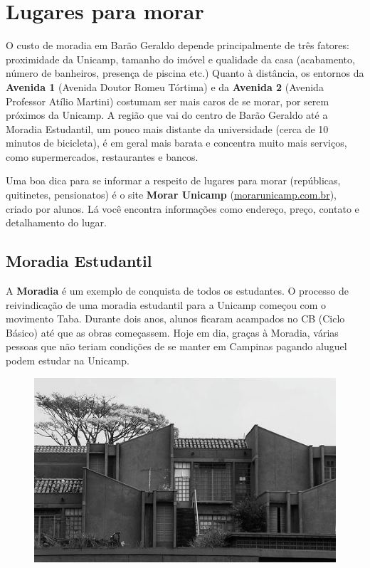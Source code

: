 
\section{Lugares para morar}

O custo de moradia em Barão Geraldo depende principalmente de três fatores:
proximidade da Unicamp, tamanho do imóvel e qualidade da casa (acabamento,
número de banheiros, presença de piscina etc.) Quanto à distância, os entornos
da \textbf{Avenida 1} (Avenida Doutor Romeu Tórtima) e da \textbf{Avenida 2}
(Avenida Professor Atílio Martini) costumam ser mais caros de se morar, por
serem próximos da Unicamp. A região que vai do centro de Barão Geraldo até a
Moradia Estudantil, um pouco mais distante da universidade (cerca de 10 minutos
de bicicleta), é em geral mais barata e concentra muito mais serviços, como
supermercados, restaurantes e bancos.

Uma boa dica para se informar a respeito de lugares para morar (repúblicas,
quitinetes, pensionatos) é o site \textbf{Morar Unicamp}
(\url{morarunicamp.com.br}), criado por alunos. Lá você encontra informações
como endereço, preço, contato e detalhamento do lugar.

\subsection{Moradia Estudantil}

A \textbf{Moradia} é um exemplo de conquista de todos os estudantes. O processo
de reivindicação de uma moradia estudantil para a Unicamp começou com o
movimento Taba. Durante dois anos, alunos ficaram acampados no CB (Ciclo Básico)
até que as obras começassem. Hoje em dia, graças à Moradia, várias pessoas que
não teriam condições de se manter em Campinas pagando aluguel podem estudar na
Unicamp.

\begin{figure}[h!]
    \centering
    \includegraphics[width=.45\textwidth]{img/barao/moradia.jpg}
\end{figure}

